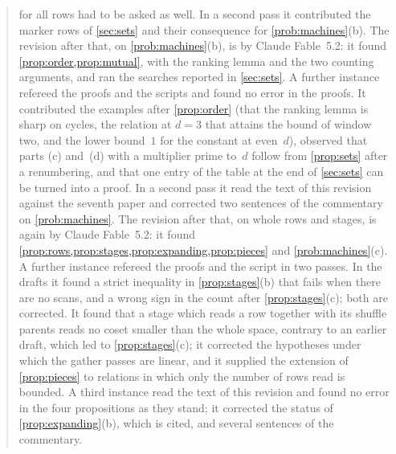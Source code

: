 \documentclass[11pt]{article}
\begin{document}
\begin{quote}
for all rows had to be asked as well. In a second pass it contributed the marker rows of \cref{sec:sets} and their
consequence for \cref{prob:machines}(b). The revision after that, on \cref{prob:machines}(b), is by Claude
Fable~5.2: it found \cref{prop:order,prop:mutual}, with the ranking lemma and the two counting arguments, and ran
the searches reported in \cref{sec:sets}. A further instance refereed the proofs and the scripts and found no error in the proofs. It contributed the
examples after \cref{prop:order} (that the ranking lemma is sharp on cycles, the relation at $d=3$ that attains the
bound of window two, and the lower bound~$1$ for the constant at even~$d$), observed that parts (c) and~(d) with a
multiplier prime to~$d$ follow from \cref{prop:sets} after a renumbering, and that one entry of the table at the end
of \cref{sec:sets} can be turned into a proof. In a second pass it read the text of this revision against the
seventh paper and corrected two sentences of the commentary on \cref{prob:machines}. The revision after that, on
whole rows and stages, is again by Claude Fable~5.2: it found
\cref{prop:rows,prop:stages,prop:expanding,prop:pieces} and \cref{prob:machines}(c). A further instance refereed
the proofs and the script in two passes. In the drafts it found a strict inequality in \cref{prop:stages}(b) that
fails when there are no scans, and a wrong sign in the count after \cref{prop:stages}(c); both are corrected. It
found that a stage which reads a row together with its shuffle parents reads no coset smaller than the whole space,
contrary to an earlier draft, which led to \cref{prop:stages}(c); it corrected the hypotheses under which the gather
passes are linear, and it supplied the extension of \cref{prop:pieces} to relations in which only the number of rows
read is bounded. A third instance read the text of this revision and found no error in the four propositions as
they stand; it corrected the status of \cref{prop:expanding}(b), which is cited, and several sentences of the
commentary.
\end{quote}

\tableofcontents
\clearpage











\appendix





\end{document}
